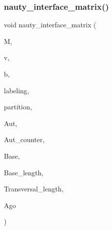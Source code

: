\subsubsection{\texorpdfstring{nauty\+\_\+interface\+\_\+matrix()}{nauty\_interface\_matrix()}}
{\footnotesize\ttfamily void nauty\+\_\+interface\+\_\+matrix (\begin{DoxyParamCaption}\item[{int $\ast$}]{M,  }\item[{int}]{v,  }\item[{int}]{b,  }\item[{int $\ast$}]{labeling,  }\item[{int $\ast$}]{partition,  }\item[{\mbox{\hyperlink{galois_8h_a09fddde158a3a20bd2dcadb609de11dc}{I\+NT}} $\ast$}]{Aut,  }\item[{int \&}]{Aut\+\_\+counter,  }\item[{int $\ast$}]{Base,  }\item[{int \&}]{Base\+\_\+length,  }\item[{int $\ast$}]{Transversal\+\_\+length,  }\item[{int \&}]{Ago }\end{DoxyParamCaption})}

\mbox{\label{nauty__interface_8_c_a67dc6f792e18b47b7cafa0cf61069217}} 
